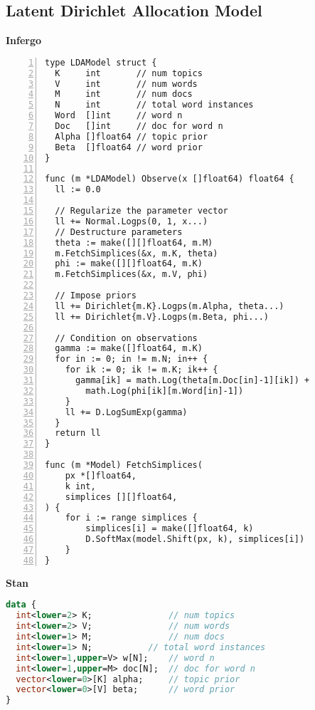 \documentclass[sigplan,review,10pt,anonymous]{acmart}
\begin{document}
\begin{figure*}
\section{Latent Dirichlet Allocation Model}
	\label{app:lda}
\vspace{\baselineskip}

\begin{minipage}[t]{0.49\textwidth}
\centering
\textbf{Infergo}

\begin{lstlisting}[framexleftmargin=10pt,numbers=left]
type LDAModel struct {
  K     int       // num topics
  V     int       // num words
  M     int       // num docs
  N     int       // total word instances
  Word  []int     // word n
  Doc   []int     // doc for word n
  Alpha []float64 // topic prior
  Beta  []float64 // word prior
}

func (m *LDAModel) Observe(x []float64) float64 {
  ll := 0.0

  // Regularize the parameter vector
  ll += Normal.Logps(0, 1, x...)
  // Destructure parameters
  theta := make([][]float64, m.M)
  m.FetchSimplices(&x, m.K, theta)
  phi := make([][]float64, m.K)
  m.FetchSimplices(&x, m.V, phi)

  // Impose priors
  ll += Dirichlet{m.K}.Logps(m.Alpha, theta...)
  ll += Dirichlet{m.V}.Logps(m.Beta, phi...)

  // Condition on observations
  gamma := make([]float64, m.K)
  for in := 0; in != m.N; in++ {
    for ik := 0; ik != m.K; ik++ {
      gamma[ik] = math.Log(theta[m.Doc[in]-1][ik]) +
        math.Log(phi[ik][m.Word[in]-1])
    }
    ll += D.LogSumExp(gamma)
  }
  return ll
}

func (m *Model) FetchSimplices(
	px *[]float64,
	k int,
	simplices [][]float64,
) {
	for i := range simplices {
		simplices[i] = make([]float64, k)
		D.SoftMax(model.Shift(px, k), simplices[i])
	}
}
\end{lstlisting}
\end{minipage}
\hfill
\begin{minipage}[t]{0.49\textwidth}
	\centering
	
	\textbf{Stan}

\begin{lstlisting}[language=Stan]
data {
  int<lower=2> K;               // num topics
  int<lower=2> V;               // num words
  int<lower=1> M;               // num docs
  int<lower=1> N;           // total word instances
  int<lower=1,upper=V> w[N];    // word n
  int<lower=1,upper=M> doc[N];  // doc for word n
  vector<lower=0>[K] alpha;     // topic prior
  vector<lower=0>[V] beta;      // word prior
}



\end{lstlisting}
\end{minipage}
\end{figure*}
\end{document}
